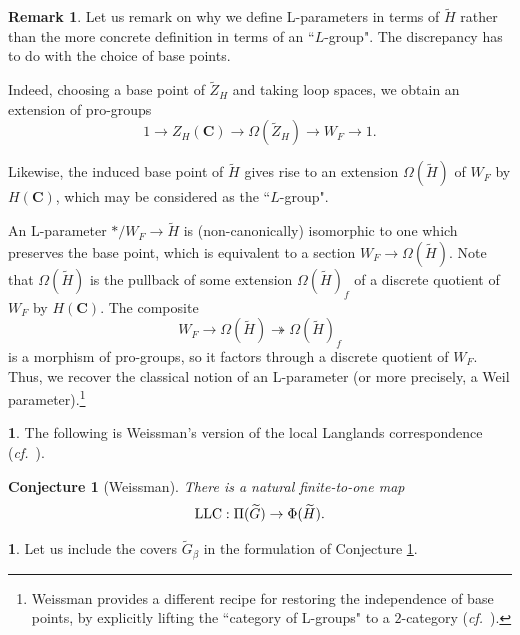 \documentclass[10pt,english,reqno]{amsart}
\newcommand{\complexes}{\mathbf C}
\newcommand{\LLC}{\textnormal{LLC}}
\newtheorem{conj}[subsubsection]{Conjecture}
\theoremstyle{definition}
\newtheorem{rem}[subsubsection]{Remark}
\numberwithin{equation}{section}
\newtheorem{untitledsubsubsection}[subsubsection]{}
\newenvironment{void}
{\begin{untitledsubsubsection}}
{\end{untitledsubsubsection}}
\begin{document}
\begin{rem}
Let us remark on why we define L-parameters in terms of $\widetilde H$ rather than the more concrete definition in terms of an ``$L$-group". The discrepancy has to do with the choice of base points.

Indeed, choosing a base point of $\widetilde Z_H$ and taking loop spaces, we obtain an extension of pro-groups
$$
1 \rightarrow Z_H(\complexes) \rightarrow \Omega(\widetilde Z_H) \rightarrow W_F \rightarrow 1.
$$

Likewise, the induced base point of $\widetilde H$ gives rise to an extension $\Omega(\widetilde H)$ of $W_F$ by $H(\complexes)$, which may be considered as the ``$L$-group".

An L-parameter $*/W_F \rightarrow \widetilde H$ is (non-canonically) isomorphic to one which preserves the base point, which is equivalent to a section $W_F \rightarrow \Omega(\widetilde H)$. Note that $\Omega(\widetilde H)$ is the pullback of some extension $\Omega(\widetilde H)_f$ of a discrete quotient of $W_F$ by $H(\complexes)$. The composite 
$$
W_F \rightarrow \Omega(\widetilde H) \twoheadrightarrow \Omega(\widetilde H)_f
$$
is a morphism of pro-groups, so it factors through a discrete quotient of $W_F$. Thus, we recover the classical notion of an L-parameter (or more precisely, a Weil parameter).\footnote{Weissman provides a different recipe for restoring the independence of base points, by explicitly lifting the ``category of L-groups" to a $2$-category (\emph{cf.}~\cite[\S5.1]{MR3802418}).}
\end{rem}


\begin{void}
The following is Weissman's version of the local Langlands correspondence (\emph{cf.}~\cite[Conjecture 0.1]{MR3802418}).
\end{void}


\begin{conj}[Weissman]
\label{conj-local-langlands-correspondence}
There is a natural finite-to-one map
\begin{equation}
\label{eq-local-langlands-correspondence}
\LLC : \Pi(\widetilde G) \rightarrow \Phi(\widetilde H).
\end{equation}
\end{conj}


\begin{void}
Let us include the covers $\widetilde G_{\beta}$ in the formulation of Conjecture \ref{conj-local-langlands-correspondence}.
\end{void}
\end{document}
